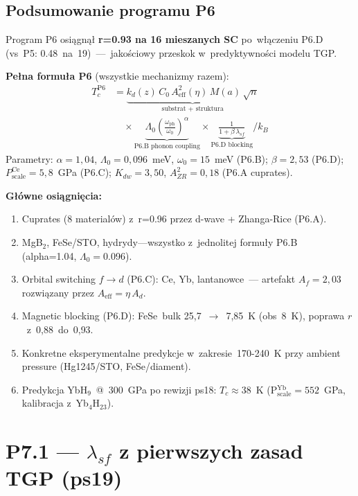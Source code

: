 \subsection{Podsumowanie programu P6}
\label{sec:P6-summary}

Program P6 osi\k{a}gn\k{a}\l{} \textbf{r=0.93 na 16 mieszanych SC}
po~w\l{}\k{a}czeniu P6.D (vs~P5: 0.48~na~19)~---~jako\'sciowy przeskok
w~predyktywno\'sci modelu TGP.

\medskip\noindent\textbf{Pe\l{}na formu\l{}a P6} (wszystkie mechanizmy razem):
\begin{align*}
  T_c^\text{P6} &= \underbrace{k_d(z)\,C_0\,A_\text{eff}^2(\eta)\,M(a)\,\sqrt{n}}_{\text{substrat + struktura}} \\
  &\quad\times \underbrace{\Lambda_0 \left(\frac{\omega_\text{ph}}{\omega_0}\right)^\alpha}_{\text{P6.B phonon coupling}}
  \times \underbrace{\frac{1}{1+\beta\,\lambda_{sf}}}_{\text{P6.D blocking}} \bigg/ k_B
\end{align*}
Parametry: $\alpha\!=\!1{,}04$, $\Lambda_0\!=\!0{,}096$~meV, $\omega_0\!=\!15$~meV
(P6.B); $\beta\!=\!2{,}53$ (P6.D); $P_\text{scale}^\text{Ce}\!=\!5{,}8$~GPa (P6.C);
$K_{dw}\!=\!3{,}50$, $A_{ZR}^2\!=\!0{,}18$ (P6.A cuprates).

\medskip\noindent\textbf{G\l{}\'owne osi\k{a}gni\k{e}cia:}
\begin{enumerate}\itemsep0pt
  \item Cuprates (8 material\'ow) z~r=0.96 przez d-wave + Zhanga-Rice (P6.A).
  \item MgB${}_2$, FeSe/STO, hydrydy---wszystko z~jednolitej formu\l{}y
    P6.B (alpha=1.04, $\Lambda_0=$0.096).
  \item Orbital switching $f\!\to\!d$ (P6.C): Ce, Yb, lantanowce~---
    artefakt $A_f=2{,}03$ rozwi\k{a}zany przez $A_\text{eff}\!=\!\eta\,A_d$.
  \item Magnetic blocking (P6.D): FeSe~bulk 25{,}7~$\to$~7{,}85~K
    (obs~8~K), poprawa $r$~z~0{,}88~do~0{,}93.
  \item Konkretne eksperymentalne predykcje w~zakresie~170-240~K
    przy ambient pressure (Hg1245/STO, FeSe/diament).
  \item Predykcja YbH$_9$~@~300~GPa po rewizji ps18: $T_c\!\approx\!38$~K
    (P$_\text{scale}^\text{Yb}\!=\!552$~GPa, kalibracja z~Yb$_4$H$_{23}$).
\end{enumerate}

\section*{P7.1 --- $\lambda_{sf}$ z pierwszych zasad TGP (ps19)}

